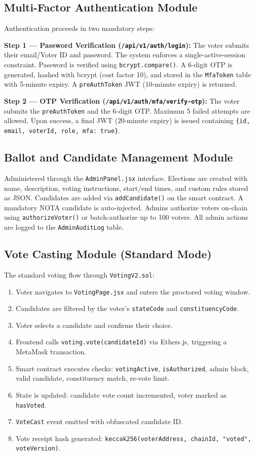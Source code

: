 \documentclass[oneside,a4paper,12pt]{book}
\begin{document}
\subsection{Multi-Factor Authentication Module}
Authentication proceeds in two mandatory steps:

\textbf{Step 1 --- Password Verification (\texttt{/api/v1/auth/login}):} The voter submits their email/Voter ID and password. The system enforces a single-active-session constraint. Password is verified using \texttt{bcrypt.compare()}. A 6-digit OTP is generated, hashed with bcrypt (cost factor 10), and stored in the \texttt{MfaToken} table with 5-minute expiry. A \texttt{preAuthToken} JWT (10-minute expiry) is returned.

\textbf{Step 2 --- OTP Verification (\texttt{/api/v1/auth/mfa/verify-otp}):} The voter submits the \texttt{preAuthToken} and the 6-digit OTP. Maximum 5 failed attempts are allowed. Upon success, a final JWT (20-minute expiry) is issued containing \texttt{\{id, email, voterId, role, mfa: true\}}.

\subsection{Ballot and Candidate Management Module}
Administered through the \texttt{AdminPanel.jsx} interface. Elections are created with name, description, voting instructions, start/end times, and custom rules stored as JSON. Candidates are added via \texttt{addCandidate()} on the smart contract. A mandatory NOTA candidate is auto-injected. Admins authorize voters on-chain using \texttt{authorizeVoter()} or batch-authorize up to 100 voters. All admin actions are logged to the \texttt{AdminAuditLog} table.

\subsection{Vote Casting Module (Standard Mode)}
The standard voting flow through \texttt{VotingV2.sol}:
\begin{enumerate}[leftmargin=1.5cm]
    \item Voter navigates to \texttt{VotingPage.jsx} and enters the proctored voting window.
    \item Candidates are filtered by the voter's \texttt{stateCode} and \texttt{constituencyCode}.
    \item Voter selects a candidate and confirms their choice.
    \item Frontend calls \texttt{voting.vote(candidateId)} via Ethers.js, triggering a MetaMask transaction.
    \item Smart contract executes checks: \texttt{votingActive}, \texttt{isAuthorized}, admin block, valid candidate, constituency match, re-vote limit.
    \item State is updated: candidate vote count incremented, voter marked as \texttt{hasVoted}.
    \item \texttt{VoteCast} event emitted with obfuscated candidate ID.
    \item Vote receipt hash generated: \texttt{keccak256(voterAddress, chainId, "voted", voteVersion)}.
\end{enumerate}
\end{document}

